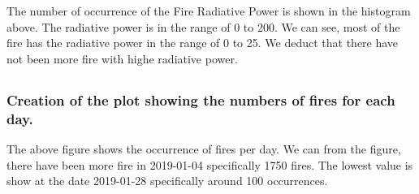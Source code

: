 \documentclass[11pt,a4paper]{article}
\begin{document}
    The number of occurrence of the Fire Radiative Power is shown in the
histogram above. The radiative power is in the range of 0 to 200. We can
see, most of the fire has the radiative power in the range of 0 to 25. We deduct that there have not been more fire with highe radiative power.


\subsection{}  
    \hypertarget{create-a-plot-showing-the-numbers-of-fires-for-each-day.}{%
\subsubsection{Creation of the plot showing the numbers of fires for each
day.}\label{create-a-plot-showing-the-numbers-of-fires-for-each-day.}}

    The above figure shows the occurrence of fires per day. We can from the
figure, there have been more fire in 2019-01-04 specifically 1750 fires.
The lowest value is show at the date 2019-01-28 specifically around 100
occurrences.
\end{document}
